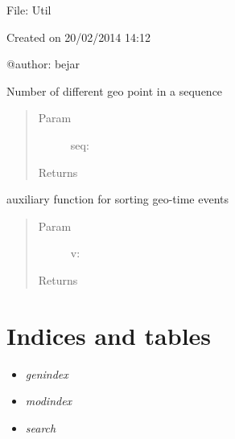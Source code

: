 \documentclass[letterpaper,10pt,english]{sphinxmanual}
\begin{document}
File: Util

Created on 20/02/2014 14:12

@author: bejar

\begin{fulllineitems}
\label{index:SuperHub.Util.diff_items}
Number of different geo point in a sequence
\begin{quote}\begin{description}
\item[{Param }] \leavevmode
seq:

\item[{Returns}] \leavevmode


\end{description}\end{quote}

\end{fulllineitems}


\begin{fulllineitems}
\label{index:SuperHub.Util.item_key_sort}
auxiliary function for sorting geo-time events
\begin{quote}\begin{description}
\item[{Param }] \leavevmode
v:

\item[{Returns}] \leavevmode


\end{description}\end{quote}

\end{fulllineitems}



\chapter{Indices and tables}
\label{index:indices-and-tables}\begin{itemize}
\item {} 
\emph{genindex}

\item {} 
\emph{modindex}

\item {} 
\emph{search}

\end{itemize}
\end{document}
